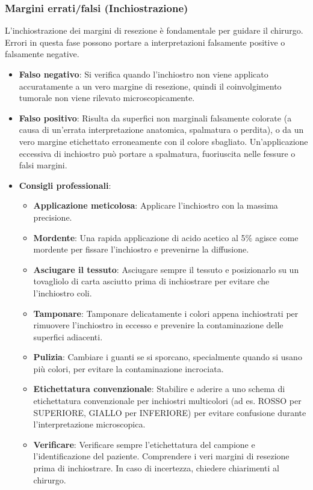 \subsubsection{Margini errati/falsi (Inchiostrazione)}
L'inchiostrazione dei margini di resezione è fondamentale per guidare il chirurgo.  Errori in questa fase possono portare a interpretazioni falsamente positive o falsamente negative. 
\begin{itemize}
    \item   \textbf{Falso negativo}: Si verifica quando l'inchiostro non viene applicato accuratamente a un vero margine di resezione, quindi il coinvolgimento tumorale non viene rilevato microscopicamente. 
    \item   \textbf{Falso positivo}: Risulta da superfici non marginali falsamente colorate (a causa di un'errata interpretazione anatomica, spalmatura o perdita), o da un vero margine etichettato erroneamente con il colore sbagliato.  Un'applicazione eccessiva di inchiostro può portare a spalmatura, fuoriuscita nelle fessure o falsi margini. 
    \item   \textbf{Consigli professionali}:
    \begin{itemize}
        \item   \textbf{Applicazione meticolosa}: Applicare l'inchiostro con la massima precisione. 
        \item   \textbf{Mordente}: Una rapida applicazione di acido acetico al 5\% agisce come mordente per fissare l'inchiostro e prevenirne la diffusione. 
        \item   \textbf{Asciugare il tessuto}: Asciugare sempre il tessuto e posizionarlo su un tovagliolo di carta asciutto prima di inchiostrare per evitare che l'inchiostro coli. 
        \item   \textbf{Tamponare}: Tamponare delicatamente i colori appena inchiostrati per rimuovere l'inchiostro in eccesso e prevenire la contaminazione delle superfici adiacenti. 
        \item   \textbf{Pulizia}: Cambiare i guanti se si sporcano, specialmente quando si usano più colori, per evitare la contaminazione incrociata. 
        \item   \textbf{Etichettatura convenzionale}: Stabilire e aderire a uno schema di etichettatura convenzionale per inchiostri multicolori (ad es. ROSSO per SUPERIORE, GIALLO per INFERIORE) per evitare confusione durante l'interpretazione microscopica. 
        \item   \textbf{Verificare}: Verificare sempre l'etichettatura del campione e l'identificazione del paziente. Comprendere i veri margini di resezione prima di inchiostrare.  In caso di incertezza, chiedere chiarimenti al chirurgo.
    \end{itemize}
\end{itemize}

